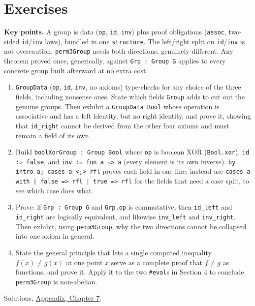 \section{Exercises}\label{sec:07-groups:07-exercises:1}

\textbf{Key points.} A group is data (\texttt{op}, \texttt{id}, \texttt{inv}) plus proof obligations (\texttt{assoc}, two-sided \texttt{id}/\texttt{inv} laws), bundled in one \texttt{structure}. The left/right split on \texttt{id}/\texttt{inv} is not overcaution: \texttt{perm3Group} needs both directions, genuinely different. Any theorem proved once, generically, against \texttt{Grp : Group G} applies to every concrete group built afterward at no extra cost.

\begin{enumerate}
\def\labelenumi{\arabic{enumi}.}
\item
  \texttt{GroupData} (\texttt{op}, \texttt{id}, \texttt{inv}, no axioms) type-checks for any choice of the three fields, including nonsense ones. State which fields \texttt{Group} adds to cut out the genuine groups. Then exhibit a \texttt{GroupData Bool} whose operation is associative and has a left identity, but no right identity, and prove it, showing that \texttt{id\_\allowbreak{}right} cannot be derived from the other four axioms and must remain a field of its own.
\item
  Build \texttt{boolXorGroup : Group Bool} where \texttt{op} is boolean XOR (\texttt{Bool.xor}), \texttt{id := false}, and \texttt{inv := fun a => a} (every element is its own inverse). \texttt{by intro a; cases a <;> rfl} proves each field in one line; instead use \texttt{cases a with | false => rfl | true => rfl} for the fields that need a case split, to see which case does what.
\item
  Prove: if \texttt{Grp : Group G} and \texttt{Grp.op} is commutative, then \texttt{id\_\allowbreak{}left} and \texttt{id\_\allowbreak{}right} are logically equivalent, and likewise \texttt{inv\_\allowbreak{}left} and \texttt{inv\_\allowbreak{}right}. Then exhibit, using \texttt{perm3Group}, why the two directions cannot be collapsed into one axiom in general.
\item
  State the general principle that lets a single computed inequality \(f(x) \neq g(x)\) at one point \(x\) serve as a complete proof that \(f \neq g\) as functions, and prove it. Apply it to the two \texttt{\#eval}s in Section 4 to conclude \texttt{perm3Group} is non-abelian.
\end{enumerate}

Solutions, \hyperref[sec:15-appendix-solutions:07-chapter-7:1]{Appendix, Chapter 7}.

